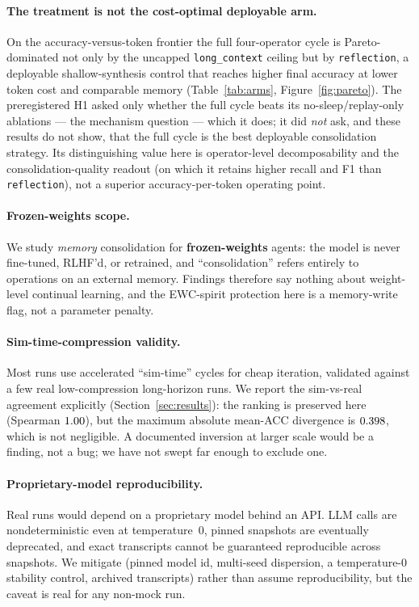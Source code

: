 \paragraph{The treatment is not the cost-optimal deployable arm.} On the
accuracy-versus-token frontier the full four-operator cycle is Pareto-dominated not
only by the uncapped \texttt{long\_context} ceiling but by \texttt{reflection}, a
deployable shallow-synthesis control \citep{park2023generativeagents} that reaches
higher final accuracy at lower token cost and comparable memory
(Table~\ref{tab:arms}, Figure~\ref{fig:pareto}). The preregistered H1 asked only
whether the full cycle beats its no-sleep/replay-only ablations --- the mechanism
question --- which it does; it did \emph{not} ask, and these results do not show,
that the full cycle is the best deployable consolidation strategy. Its
distinguishing value here is operator-level decomposability and the
consolidation-quality readout (on which it retains higher recall and F1 than
\texttt{reflection}), not a superior accuracy-per-token operating point.

\paragraph{Frozen-weights scope.} We study \emph{memory} consolidation for
\textbf{frozen-weights} agents: the model is never fine-tuned, RLHF'd, or
retrained, and ``consolidation'' refers entirely to operations on an external
memory. Findings therefore say nothing about weight-level continual learning,
and the EWC-spirit protection here is a memory-write flag, not a parameter
penalty.

\paragraph{Sim-time-compression validity.} Most runs use accelerated ``sim-time''
cycles for cheap iteration, validated against a few real low-compression
long-horizon runs. We report the sim-vs-real agreement explicitly
(Section~\ref{sec:results}): the ranking is preserved here (Spearman
$1.00$), but the maximum absolute mean-ACC divergence is
$0.398$, which is not negligible. A documented inversion at larger scale
would be a finding, not a bug; we have not swept far enough to exclude one.

\paragraph{Proprietary-model reproducibility.} Real runs would depend on a
proprietary model behind an API. LLM calls are nondeterministic even at
temperature~0, pinned snapshots are eventually deprecated, and exact transcripts
cannot be guaranteed reproducible across snapshots. We mitigate (pinned model
id, multi-seed dispersion, a temperature-0 stability control, archived
transcripts) rather than assume reproducibility, but the caveat is real for any
non-mock run.

